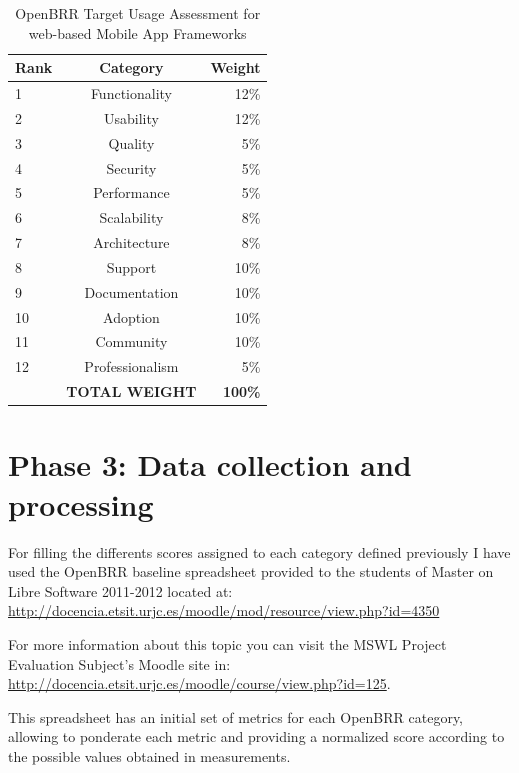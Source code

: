 \documentclass[a4paper,12pt]{book}
\begin{document}
\begin{table}[ht]
\begin{center}
    \begin{tabular}{ | l | c | r |}
    \hline
    \textbf{Rank} & \textbf{Category} & \textbf{Weight} \\ \hline
    1 & Functionality & 12\% \\ \hline
    2 & Usability & 12\% \\ \hline
    3 & Quality & 5\% \\ \hline
    4 & Security & 5\% \\ \hline
    5 & Performance & 5\% \\ \hline
    6 & Scalability & 8\% \\ \hline
    7 & Architecture & 8\% \\ \hline
    8 & Support & 10\% \\ \hline
    9 & Documentation & 10\% \\ \hline
    10 & Adoption & 10\% \\ \hline
    11 & Community & 10\% \\ \hline
    12 & Professionalism & 5\% \\ \hline
     & \textbf{TOTAL WEIGHT} & \textbf{100\%} \\ \hline  
    \end{tabular}
\end{center}
 \caption{OpenBRR Target Usage Assessment for web-based Mobile App Frameworks}
\label{OpenBRR2}
\end{table}

\section{Phase 3: Data collection and processing}
\label{sec:phase3}
For filling the differents scores assigned to each category defined previously I have used the OpenBRR baseline spreadsheet provided to the students of Master on Libre Software 2011-2012 located at:\\
\url{http://docencia.etsit.urjc.es/moodle/mod/resource/view.php?id=4350}

For more information about this topic you can visit the MSWL Project Evaluation Subject's Moodle site in:\\
\url{http://docencia.etsit.urjc.es/moodle/course/view.php?id=125}. 

This spreadsheet has an initial set of metrics for each OpenBRR category, allowing to ponderate each metric and providing a normalized score according to the possible values obtained in measurements.
\end{document}

